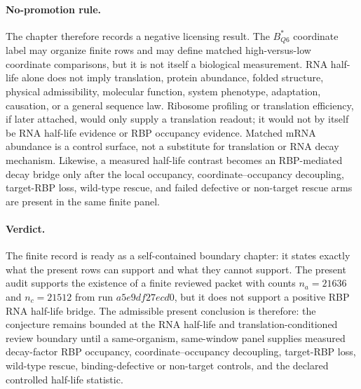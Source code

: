 \paragraph{No-promotion rule.}
The chapter therefore records a negative licensing result.  The $B^{*}_{Q6}$ coordinate label may organize finite rows and may define matched high-versus-low coordinate comparisons, but it is not itself a biological measurement.  RNA half-life alone does not imply translation, protein abundance, folded structure, physical admissibility, molecular function, system phenotype, adaptation, causation, or a general sequence law.  Ribosome profiling or translation efficiency, if later attached, would only supply a translation readout; it would not by itself be RNA half-life evidence or RBP occupancy evidence.  Matched mRNA abundance is a control surface, not a substitute for translation or RNA decay mechanism.  Likewise, a measured half-life contrast becomes an RBP-mediated decay bridge only after the local occupancy, coordinate--occupancy decoupling, target-RBP loss, wild-type rescue, and failed defective or non-target rescue arms are present in the same finite panel.

\paragraph{Verdict.}
The finite record is ready as a self-contained boundary chapter: it states exactly what the present rows can support and what they cannot support.  The present audit supports the existence of a finite reviewed packet with counts $n_a=21636$ and $n_c=21512$ from run $a5e9df27ecd0$, but it does not support a positive RBP RNA half-life bridge.  The admissible present conclusion is therefore: the conjecture remains bounded at the RNA half-life and translation-conditioned review boundary until a same-organism, same-window panel supplies measured decay-factor RBP occupancy, coordinate--occupancy decoupling, target-RBP loss, wild-type rescue, binding-defective or non-target controls, and the declared controlled half-life statistic.